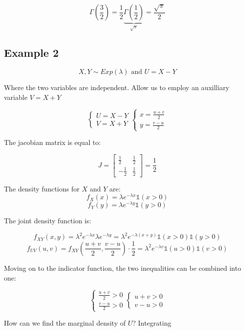 
\[\Gamma (\frac{3}{2}) = \frac{1}{2} \underbrace{\Gamma (\frac{1}{2})}_{\sqrt{ \pi }} = \frac{ \sqrt{\pi} }{2} \]

\subsection{Example 2}

\[ X, Y \sim Exp (\lambda) \text{ and } U=X-Y \]

Where the two variables are independent.
Allow us to employ an auxilliary variable \(V=X+Y\)

\[
\begin{cases}
    U = X-Y \\
    V = X+Y
\end{cases} \begin{cases}
    x = \frac{u+v}{2} \\
    y = \frac{v-u}{2}
\end{cases}
\]

The jacobian matrix is equal to:

\[
J = \begin{bmatrix}
\frac{1}{2} & \frac{1}{2} \\
-\frac{1}{2} & \frac{1}{2}
\end{bmatrix} = \frac{1}{2}
\]

The density functions for \(X\) and \(Y\) are:
\[f_X (x) = \lambda e^{-\lambda x} \mathbb{1}(x>0)\]
\[f_Y (y) = \lambda e^{-\lambda y} \mathbb{1}(y>0)\]

The joint density function is:

\[
f_{XY} (x,y) = \lambda^2 e^{-\lambda x} \lambda e^{-\lambda y} = \lambda^2 e^{-\lambda (x+y)} \mathbb{1}(x>0) \mathbb{1}(y>0)
\]
\[
f_{UV} (u,v) = f_{XY} (\frac{u+v}{2}, \frac{v-u}{2}) \cdot \frac{1}{2} = \lambda^2 e^{-\lambda v} \mathbb{1}(u>0) \mathbb{1}(v>0)
\]

Moving on to the indicator function, the two inequalities can be combined into one:

\[
\begin{cases}
    \frac{u+v}{2} > 0 \\
    \frac{v-u}{2} > 0
\end{cases} \begin{cases}
    u+v > 0 \\
    v-u > 0
\end{cases}
\]

How can we find the marginal density of \(U\)? Integrating

